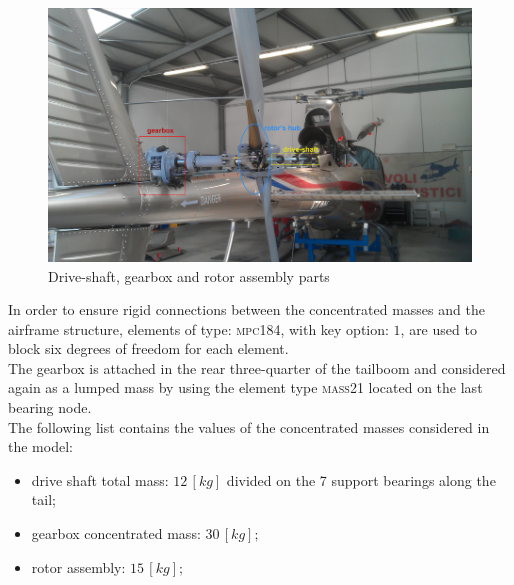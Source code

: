 \begin{figure}[h!]
	\begin{center}
		\centering  		 		
		\includegraphics[width=1\linewidth]{PICTURES/3_Ecureuil/IMAG0112.png}
	\end{center}
	\caption{Drive-shaft, gearbox and rotor assembly parts}
\end{figure}	
\vspace{0.5cm}


\noindent
In order to ensure rigid connections between the concentrated masses and the airframe structure, elements of type: \textsc{mpc184}, with key option: $1$, are used to block six degrees of freedom for each element. \\

\noindent
The gearbox is attached in the rear three-quarter of the tailboom and considered again as a lumped mass by using the element type \textsc{mass21} located on the last bearing node. \\

\clearpage
\medskip
\noindent
The following list contains the values of the concentrated masses considered in the model:

\begin{itemize}
	\item drive shaft total mass: $12\,[kg]$ divided on the 7 support bearings along the tail;
	\item gearbox concentrated mass: $30\,[kg];$
	\item rotor assembly: $15\,[kg];$
\end{itemize}

